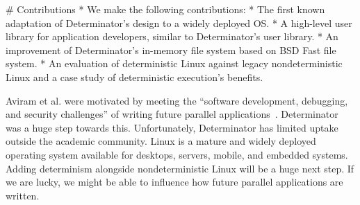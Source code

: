 # Contributions
* We make the following contributions:
* The first known adaptation of Determinator's design to a widely deployed OS.
* A high-level user library for application developers, similar to
  Determinator's user library.
* An improvement of Determinator's in-memory file system based on BSD Fast
  file system.
* An evaluation of deterministic Linux against legacy nondeterministic Linux and
  a case study of deterministic execution's benefits.

\fi

Aviram et al. were motivated by meeting the ``software development, debugging,
and security challenges'' of writing future parallel
applications~\cite{Aviram10}. Determinator was a huge step towards this.
Unfortunately, Determinator has limited uptake outside the academic community.
Linux is a mature and widely deployed operating system available for desktops,
servers, mobile, and embedded systems. Adding determinism alongside
nondeterministic Linux will be a huge next step. If we are lucky, we might be
able to influence how future parallel applications are written.

\iffalse

# Why?
* Aviram et al. were motivated by meeting the "software development, debugging,
  and security challenges" for parallel applications of the future. Determinator
  was a step towards this.
* Determinator itself has limited uptake, since it was written from scratch in
  an academic environment.
* Linux is a mature and widely deployed operating system; available for
  desktops, servers, mobile, embedded.
* If we can add determinism alongside nondeterministic Linux, this will be a
  huge next step.

# Benefits
* According to Bergan et al., determinism provides benefits in four main areas:
  debugging, testing, fault tolerance, and security.
* Repeatability makes debugging easier and can be exploited to provide fault
  tolerance via replication.
* Determinism eliminates the exponential blow up of scheduling sequences.
* Determinism eliminates covert timing channels that can be used to extract
  sensitive data from privileged threads.
* Predictability allows better testing methodologies.

(will elaborate on benefits in separate section)

[MW: state the benefits in one or two sentences (four is too many), and
say that you'll elaborate later.]

\fi

